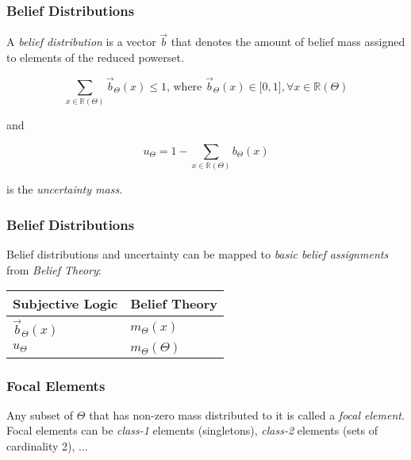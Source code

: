 \documentclass{beamer}
\begin{document}

\begin{frame}
\frametitle{Belief Distributions}

A \emph{belief distribution} is a vector $\vec{b}$ that denotes the amount of belief
mass assigned to elements of the reduced powerset.

$$
\sum_{x \in \mathbb{R}\left(\Theta\right)} \vec{b}_\Theta \left(x \right) \leq 1 \mbox{, where }
    \vec{b}_\Theta\left(x\right) \in \lbrack 0, 1 \rbrack, \forall x \in \mathbb{R}\left(\Theta\right)
$$

and

$$
u_\Theta = 1 - \sum_{x \in \mathbb{R}\left(\Theta\right)} b_\Theta \left( x \right)
$$

is the \emph{uncertainty mass}.

\end{frame}


\begin{frame}
\frametitle{Belief Distributions}

Belief distributions and uncertainty can be mapped to \emph{basic belief assignments} from
\emph{Belief Theory}:

\begin{table}
\centering

\begin{tabular}{|l|l|}
  \hline
  Subjective Logic & Belief Theory \\
  \hline
  $\vec{b}_\Theta\left( x \right)$ & $m_\Theta\left( x \right)$ \\
  $u_\Theta$                 & $m_\Theta \left(\Theta\right)$ \\
  \hline
\end{tabular}

\end{table}

\end{frame}


\begin{frame}
\frametitle{Focal Elements}

Any subset of $\Theta$ that has non-zero mass distributed to it is called a
\emph{focal element}. Focal elements can be \emph{class-1} elements (singletons),
\emph{class-2} elements (sets of cardinality 2), ...

\end{frame}
\end{document}
